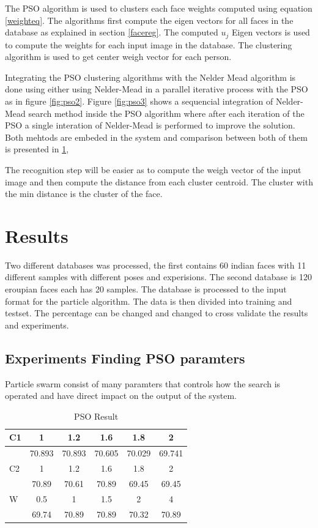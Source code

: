 \documentclass[a4paper,twoside]{article}
\begin{document}
The PSO algorithm is used to clusters each face weights computed using equation \ref{weighteq}. The algorithms first compute the eigen vectors for all faces in the database as explained in section \ref{facereg}. The computed $u_j$ Eigen vectors is used to compute the weights for each input image in the database. The clustering algorithm is used to get center weigh vector for each person. %


Integrating the PSO clustering algorithms with the Nelder Mead algorithm is done using either using Nelder-Mead in a parallel iterative process with the PSO as in figure \ref{fig:pso2}. Figure \ref{fig:pso3} shows a sequencial integration of Nelder-Mead search method inside the PSO algorithm where after each iteration of the PSO a single interation of Nelder-Mead is performed to improve the solution. Both mehtods are embeded in the system and comparison  between both of them is presented in \ref{sec:Results}, %


The recognition step will be easier as to compute the weigh vector of the input image and then compute the distance from each cluster centroid. The cluster with the min distance is the cluster of the face.

\section{Results}
\label{sec:Results}
Two different databases \cite{JainMukherjeeIndianFaceDB}was processed, the first
contains 60 indian faces with 11 different samples with different poses and experisions. The second database is 120 eroupian faces each has 20 samples. The database is processed to the input format for the particle algorithm. The data is then divided into training and testset. The percentage can be changed and changed to cross validate the results and experiments.

\subsection{Experiments Finding PSO paramters}
\label{sec:pso}

Particle swarm consist of many paramters that controls how the search is operated and have direct impact on the output of the system. 

\begin{table}
	\centering
		\caption{PSO Result }
	\label{tab:PSO1}
		\begin{tabular}{|l|c|c|c|c|c|}
		 \hline
C1 &	1	&1.2&	1.6&	1.8 &	2	\\ \hline
	&70.893	&70.893	&70.605	&70.029	&69.741 \\  \hline
C2	&	1	&1.2&	1.6&	1.8 &	2	\\ \hline
	&70.89	&70.61	&70.89	&69.45	&69.45 \\ \hline
W	&0.5&	1	&1.5	&2&	4	\\ \hline
	&69.74	&70.89&	70.89	&70.32&	70.89	\\ \hline
\end{tabular}
\end{table}
\end{document}
